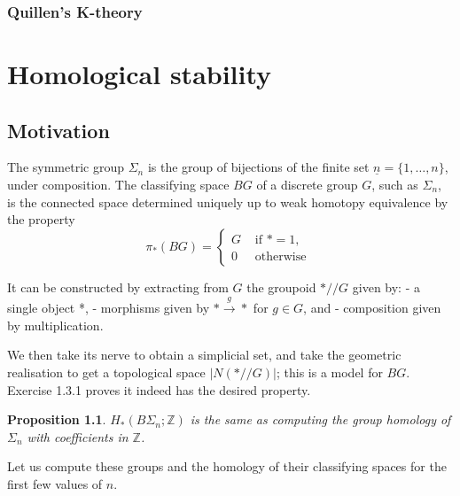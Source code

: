 \documentclass{book}
\newtheorem{prop}{Proposition}
\begin{document}
\section{Quillen's K-theory}


\part{Homological stability}
\chapter{Motivation}


\cite{kupersHomstabPdf2021}

The symmetric group $\Sigma_n$ is the group of bijections of the finite set $\underline{n}=\{1, \ldots, n\}$, under composition. The classifying space $B G$ of a discrete group $G$, such as $\Sigma_n$, is the connected space determined uniquely up to weak homotopy equivalence by the property
$$
\pi_*(B G)= \begin{cases}G & \text { if } *=1, \\ 0 & \text { otherwise }\end{cases}
$$

It can be constructed by extracting from $G$ the groupoid $* / / G$ given by:
- a single object *,
- morphisms given by $* \xrightarrow{g} *$ for $g \in G$, and
- composition given by multiplication.

We then take its nerve to obtain a simplicial set, and take the geometric realisation to get a topological space $|N(* / / G)|$; this is a model for $B G$. Exercise 1.3.1 proves it indeed has the desired property.


\begin{prop}
    $H_*\left(B \Sigma_n ; \mathbb{Z}\right)$  is the same as computing the group homology of $\Sigma_n$ with coefficients in $\mathbb{Z}$.
\end{prop}
Let us compute these groups and the homology of their classifying spaces for the first few values of $n$.
\end{document}
